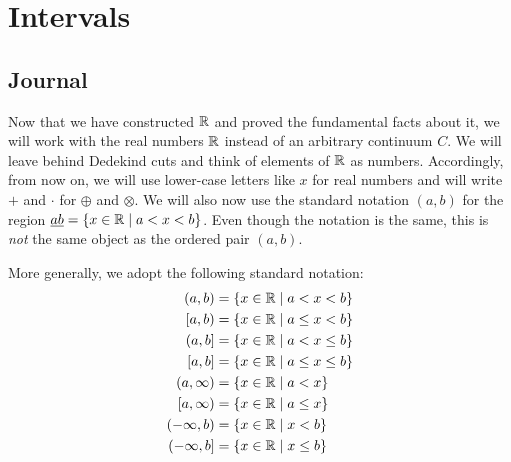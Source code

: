\documentclass[../main.tex]{subfiles}
\begin{document}
\chapter{Intervals}\label{sct:8}
\section{Journal}
Now that we have constructed $\mathbb{R}$ and proved the fundamental facts about it, we will work with the real numbers $\mathbb{R}$ instead of an arbitrary continuum $C$. We will leave behind Dedekind cuts and think of elements of $\mathbb{R}$ as numbers. Accordingly, from now on, we will use lower-case letters like $x$ for real numbers and will write $+$ and $\cdot$ for $\oplus$ and $\otimes$. We will also now use the standard notation $(a,b)$ for the region $\underline{ab}=\{x\in\mathbb{R}\mid a<x<b\}$. Even though the notation is the same, this is \emph{not} the same object as the ordered pair $(a,b)$.\par
More generally, we adopt the following standard notation:
\begin{align}
    \begin{split}
        (a,b) &= \{x\in\R\mid a<x<b\}\\
        [a,b) &= \{x\in\R\mid a\leq x<b\}\\
        (a,b] &= \{x\in\R\mid a<x\leq b\}\\
        [a,b] &= \{x\in\R\mid a\leq x\leq b\}\\
        (a,\infty) &= \{x\in\R\mid a<x\}\\
        [a,\infty) &= \{x\in\R\mid a\leq x\}\\
        (-\infty,b) &= \{x\in\R\mid x<b\}\\
        (-\infty,b] &= \{x\in\R\mid x\leq b\}
    \end{split}\label{eqn:8.1}
\end{align}
\end{document}
